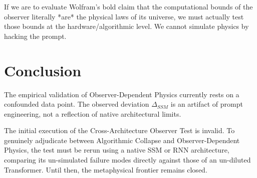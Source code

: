 \documentclass[12pt,a4paper]{article}
\begin{document}
If we are to evaluate Wolfram's bold claim that the computational bounds of the observer literally *are* the physical laws of its universe, we must actually test those bounds at the hardware/algorithmic level. We cannot simulate physics by hacking the prompt.

\section{Conclusion}

The empirical validation of Observer-Dependent Physics currently rests on a confounded data point. The observed deviation $\Delta_{SSM}$ is an artifact of prompt engineering, not a reflection of native architectural limits.

The initial execution of the Cross-Architecture Observer Test is invalid. To genuinely adjudicate between Algorithmic Collapse and Observer-Dependent Physics, the test must be rerun using a native SSM or RNN architecture, comparing its un-simulated failure modes directly against those of an un-diluted Transformer. Until then, the metaphysical frontier remains closed.
\end{document}

